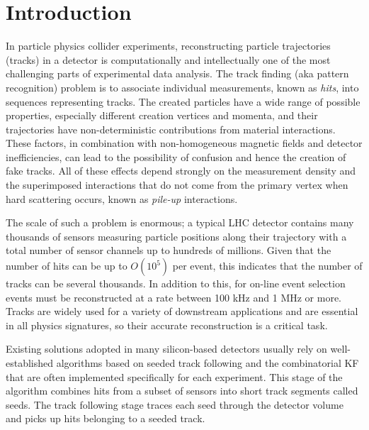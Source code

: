 
\chapter{Introduction}

\setlength\parindent{0pt}

In particle physics collider experiments, reconstructing particle trajectories (tracks) in a detector is computationally and intellectually one of the most challenging parts of experimental data analysis. The track finding (aka pattern recognition) problem is to associate individual measurements, known as \textit{hits}, into sequences representing tracks. The created particles have a wide range of possible properties, especially different creation vertices and momenta, and their trajectories have non-deterministic contributions from material interactions. These factors, in combination with non-homogeneous magnetic fields and detector inefficiencies, can lead to the possibility of confusion and hence the creation of fake tracks. All of these effects depend strongly on the measurement density and the superimposed interactions that do not come from the primary vertex when hard scattering occurs, known as \textit{pile-up} interactions.

The scale of such a problem is enormous; a typical \ac{LHC} detector contains many thousands of sensors measuring particle positions along their trajectory with a total number of sensor channels up to hundreds of millions. Given that the number of hits can be up to $O(10^{5})$ per event, this indicates that the number of tracks can be several thousands. In addition to this, for on-line event selection events must be reconstructed at a rate between 100 kHz and 1 MHz or more. Tracks are widely used for a variety of downstream applications and are essential in all physics signatures, so their accurate reconstruction is a critical task.   

Existing solutions adopted in many silicon-based detectors usually rely on well-established algorithms based on seeded track following and the combinatorial \ac{KF} \cite{AGOSTINELLI2003250} that are often implemented specifically for each experiment. This stage of the algorithm combines hits from a subset of sensors into short track segments called seeds. The track following stage traces each seed through the detector volume and picks up hits belonging to a seeded track.


